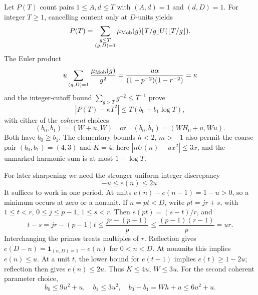 \documentclass[11pt]{article}
\theoremstyle{definition}\newtheorem{definition}[theorem]{Definition}
\theoremstyle{remark}\newtheorem{remark}[theorem]{Remark}
\begin{document}
Let \(P(T)\) count pairs \(1\leq A,d\leq T\) with
\((A,d)=1\) and \((d,D)=1\). For integer \(T\geq1\), cancelling content
only at \(D\)-units yields
\[
 P(T)=\sum_{\substack{g\leq T\\(g,D)=1}}
       \mu_{\rm Mob}(g)\lfloor T/g\rfloor U(\lfloor T/g\rfloor).
\]
The Euler product
\[
 u\sum_{(g,D)=1}\frac{\mu_{\rm Mob}(g)}{g^2}
   =\frac{u\alpha}{(1-p^{-2})(1-r^{-2})}=\kappa
\]
and the integer-cutoff bound
\(\sum_{g>T}g^{-2}\leq T^{-1}\) prove
\begin{equation}
 |P(T)-\kappa T^2|\leq T(b_0+b_1\log T),
 \label{ap:primitive-error}
\end{equation}
with either of the \emph{coherent} choices
\[
 (b_0,b_1)=(W+u,W)
 \quad\text{or}\quad
 (b_0,b_1)=(WH_0+u,Wu).
\]
Both have \(b_0\geq b_1\). The elementary bounds \(h<2\), \(m>-1\)
also permit the coarse pair \((b_0,b_1)=(4,3)\) and \(K=4\):
here \(|nU(n)-ux^2|\leq3x\), and the unmarked harmonic sum is
at most \(1+\log T\).

For later sharpening we need the stronger uniform integer discrepancy
\begin{equation}
 -u\leq e(n)\leq2u.
 \label{ap:refined-discrepancy}
\end{equation}
It suffices to work in one period. At units \(e(n)-e(n-1)=1-u>0\),
so a minimum occurs at zero or a nonunit. If \(n=pt<D\), write
\(pt=jr+s\), with \(1\leq t<r\), \(0\leq j\leq p-1\), \(1\leq s<r\).
Then \(e(pt)=(s-t)/r\), and
\[
 t-s=jr-(p-1)t
 \leq\frac{jr-(p-1)}p
 \leq\frac{(p-1)(r-1)}p=ur.
\]
Interchanging the primes treats multiples of \(r\).
Reflection gives
\(e(D-n)=\mathbf1_{(n,D)=1}-e(n)\) for \(0<n<D\).
At nonunits this implies \(e(n)\leq u\).
At a unit \(t\), the lower bound for \(e(t-1)\) implies
\(e(t)\geq1-2u\); reflection then gives \(e(n)\leq2u\).
Thus \(K\leq4u\), \(W\leq3u\). For the second coherent parameter choice,
\begin{equation}
 b_0\leq9u^2+u,\quad b_1\leq3u^2,\quad
 b_0-b_1=Wh+u\leq6u^2+u .
 \label{ap:refined-parameters}
\end{equation}
\end{document}
